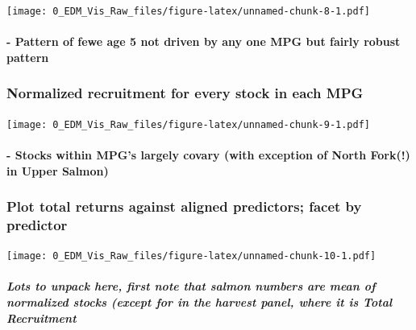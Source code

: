 \documentclass[]{article}
\let\oldparagraph\paragraph
\renewcommand{\paragraph}[1]{\oldparagraph{#1}\mbox{}}
\let\oldsubparagraph\subparagraph
\renewcommand{\subparagraph}[1]{\oldsubparagraph{#1}\mbox{}}
\begin{document}
\texttt{[image: 0\_EDM\_Vis\_Raw\_files/figure-latex/unnamed-chunk-8-1.pdf]}

\hypertarget{pattern-of-fewe-age-5-not-driven-by-any-one-mpg-but-fairly-robust-pattern}{%
\paragraph{- Pattern of fewe age 5 not driven by any one MPG but fairly
robust
pattern}\label{pattern-of-fewe-age-5-not-driven-by-any-one-mpg-but-fairly-robust-pattern}}

\hypertarget{normalized-recruitment-for-every-stock-in-each-mpg}{%
\subsubsection{Normalized recruitment for every stock in each
MPG}\label{normalized-recruitment-for-every-stock-in-each-mpg}}

\texttt{[image: 0\_EDM\_Vis\_Raw\_files/figure-latex/unnamed-chunk-9-1.pdf]}

\hypertarget{stocks-within-mpgs-largely-covary-with-exception-of-north-fork-in-upper-salmon}{%
\paragraph{- Stocks within MPG's largely covary (with exception of North
Fork(!) in Upper
Salmon)}\label{stocks-within-mpgs-largely-covary-with-exception-of-north-fork-in-upper-salmon}}

\hypertarget{plot-total-returns-against-aligned-predictors-facet-by-predictor}{%
\subsubsection{Plot total returns against aligned predictors; facet by
predictor}\label{plot-total-returns-against-aligned-predictors-facet-by-predictor}}

\texttt{[image: 0\_EDM\_Vis\_Raw\_files/figure-latex/unnamed-chunk-10-1.pdf]}

\hypertarget{lots-to-unpack-here-first-note-that-salmon-numbers-are-mean-of-normalized-stocks-except-for-in-the-harvest-panel-where-it-is-total-recruitment}{%
\subparagraph{Lots to unpack here, first note that salmon numbers are
mean of normalized stocks (except for in the harvest panel, where it is
Total
Recruitment}\label{lots-to-unpack-here-first-note-that-salmon-numbers-are-mean-of-normalized-stocks-except-for-in-the-harvest-panel-where-it-is-total-recruitment}}
\end{document}
